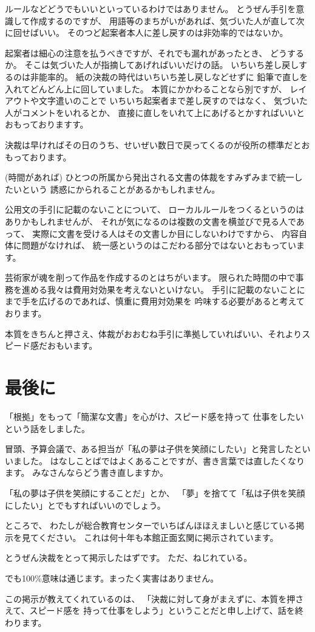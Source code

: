 \documentclass[uplatex,jis2004,dvipdfmx,12pt]{jsarticle}
\begin{document}
ルールなどどうでもいいといっているわけではありません。
とうぜん手引を意識して作成するのですが、
用語等のまちがいがあれば、気づいた人が直して次に回せばいい。
そのつど起案者本人に差し戻すのは非効率的ではないか。

起案者は細心の注意を払うべきですが、それでも漏れがあったとき、
どうするか。
そこは気づいた人が指摘してあげればいいだけの話。
いちいち差し戻しするのは非能率的。
紙の決裁の時代はいちいち差し戻しなどせずに
鉛筆で直しを入れてどんどん上に回していました。
本質にかかわることなら別ですが、
レイアウトや文字遣いのことで
いちいち起案者まで差し戻すのではなく、
気づいた人がコメントをいれるとか、
直接に直しをいれて上にあげるとかすればいいとおもっておりますす。

決裁は早ければその日のうち、せいぜい数日で戻ってくるのが役所の標準だとお
もっております。

(時間があれば)
ひとつの所属から発出される文書の体裁をすみずみまで統一したいという
誘惑にかられることがあるかもしれません。

公用文の手引に記載のないことについて、
ローカルルールをつくるというのはありかもしれませんが、
それが気になるのは複数の文書を横並びで見る人であって、
実際に文書を受ける人はその文書しか目にしないわけですから、
内容自体に問題がなければ、
統一感というのはこだわる部分ではないとおもっています。

芸術家が魂を削って作品を作成するのとはちがいます。
限られた時間の中で事務を進める我々は費用対効果を考えないといけない。
手引に記載のないことにまで手を広げるのであれば、慎重に費用対効果を
吟味する必要があると考えております。


本質をきちんと押さえ、体裁がおおむね手引に準拠していればいい、それよりス
ピード感だおもいます。

\section{最後に}
「根拠」をもって「簡潔な文書」を心がけ、スピード感を持って
仕事をしたいという話をしました。



冒頭、予算会議で、ある担当が「私の夢は子供を笑顔にしたい」と発言したとい
いました。
はなしことばではよくあることですが、書き言葉では直したくなります。
みなさんならどう書き直しますか。

「私の夢は子供を笑顔にすることだ」とか、
「夢」を捨てて「私は子供を笑顔にしたい」とでもすればいいのでしょう。

ところで、
わたしが総合教育センターでいちばんほほえましいと感じている掲示を見てください。
これは何十年も本館正面玄関に掲示されています。

とうぜん決裁をとって掲示したはずです。
ただ、ねじれている。

でも100\%意味は通じます。まったく実害はありません。


この掲示が教えてくれているのは、
「決裁に対して身がまえずに、本質を押さえて、スピード感を
持って仕事をしよう」ということだと申し上げて、話を終わります。
\end{document}
